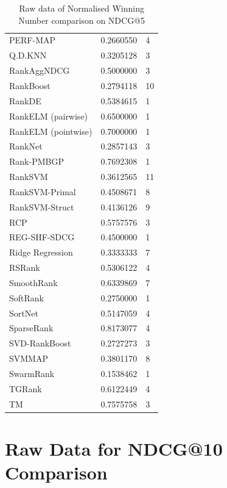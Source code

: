 \documentclass{sig-alternate-2013}
\begin{document}
\begin{table}
\begin{tabular}{l|l|l}
PERF-MAP & 0.2660550 & 4 \\ 
Q.D.KNN & 0.3205128 & 3 \\ 
RankAggNDCG & 0.5000000 & 3 \\ 
RankBoost & 0.2794118 & 10 \\ 
RankDE & 0.5384615 & 1 \\ 
RankELM (pairwise) & 0.6500000 & 1 \\ 
RankELM (pointwise) & 0.7000000 & 1 \\ 
RankNet & 0.2857143 & 3 \\ 
Rank-PMBGP & 0.7692308 & 1 \\ 
RankSVM & 0.3612565 & 11 \\ 
RankSVM-Primal & 0.4508671 & 8 \\ 
RankSVM-Struct & 0.4136126 & 9 \\ 
RCP & 0.5757576 & 3 \\ 
REG-SHF-SDCG & 0.4500000 & 1 \\ 
Ridge Regression & 0.3333333 & 7 \\ 
RSRank & 0.5306122 & 4 \\ 
SmoothRank & 0.6339869 & 7 \\ 
SoftRank & 0.2750000 & 1 \\ 
SortNet & 0.5147059 & 4 \\ 
SparseRank & 0.8173077 & 4 \\ 
SVD-RankBoost & 0.2727273 & 3 \\ 
SVMMAP & 0.3801170 & 8 \\ 
SwarmRank & 0.1538462 & 1 \\ 
TGRank & 0.6122449 & 4 \\ 
TM & 0.7575758 & 3 \\ 
\end{tabular}
\caption{Raw data of Normalised Winning Number comparison on NDCG@5}
\label{tab:raw_data_norm_winnum_NDCG5}
\end{table}

\section{Raw Data for NDCG@10 Comparison}
\label{app:norm_winnum_NDCG10}
\end{document}

